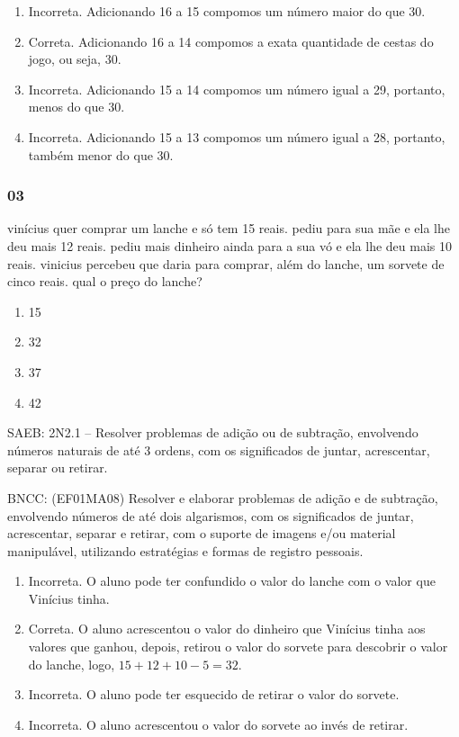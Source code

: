 \begin{enumerate}
\def\labelenumi{\alph{enumi})}
\item
  Incorreta. Adicionando 16 a 15 compomos um número maior do que 30.
\item
  Correta. Adicionando 16 a 14 compomos a exata quantidade de cestas do
  jogo, ou seja, 30.
\item
  Incorreta. Adicionando 15 a 14 compomos um número igual a 29,
  portanto, menos do que 30.
\item
  Incorreta. Adicionando 15 a 13 compomos um número igual a 28,
  portanto, também menor do que 30.
\end{enumerate}

\subsubsection{03}\label{section-25}

vinícius quer comprar um lanche e só tem 15 reais. pediu para sua mãe e
ela lhe deu mais 12 reais. pediu mais dinheiro ainda para a sua vó e ela
lhe deu mais 10 reais. vinicius percebeu que daria para comprar, além do
lanche, um sorvete de cinco reais. qual o preço do lanche?

\begin{enumerate}
\def\labelenumi{\Alph{enumi})}
\item
  15
\item
  32
\item
  37
\item
  42
\end{enumerate}

SAEB: 2N2.1 -- Resolver problemas de adição ou de subtração, envolvendo
números naturais de até 3 ordens, com os significados de juntar,
acrescentar, separar ou retirar.

BNCC: (EF01MA08) Resolver e elaborar problemas de adição e de subtração,
envolvendo números de até dois algarismos, com os significados de
juntar, acrescentar, separar e retirar, com o suporte de imagens e/ou
material manipulável, utilizando estratégias e formas de registro
pessoais.

\begin{enumerate}
\def\labelenumi{\alph{enumi})}
\item
  Incorreta. O aluno pode ter confundido o valor do lanche com o valor
  que Vinícius tinha.
\item
  Correta. O aluno acrescentou o valor do dinheiro que Vinícius tinha
  aos valores que ganhou, depois, retirou o valor do sorvete para
  descobrir o valor do lanche, logo, \(15 + 12 + 10 - 5 = 32\).
\item
  Incorreta. O aluno pode ter esquecido de retirar o valor do sorvete.
\item
  Incorreta. O aluno acrescentou o valor do sorvete ao invés de retirar.
\end{enumerate}

